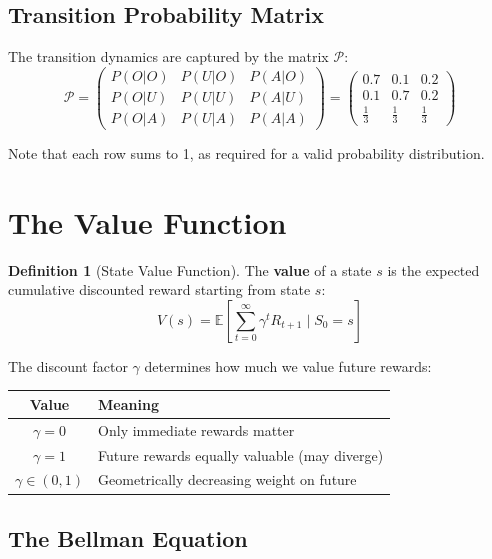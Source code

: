 \documentclass[11pt]{article}
\theoremstyle{definition}
\newtheorem{definition}{Definition}
\begin{document}
\subsection{Transition Probability Matrix}

The transition dynamics are captured by the matrix $\mathcal{P}$:
\[
\mathcal{P} = \begin{pmatrix}
P(O|O) & P(U|O) & P(A|O) \\
P(O|U) & P(U|U) & P(A|U) \\
P(O|A) & P(U|A) & P(A|A)
\end{pmatrix}
= \begin{pmatrix}
0.7 & 0.1 & 0.2 \\
0.1 & 0.7 & 0.2 \\
\frac{1}{3} & \frac{1}{3} & \frac{1}{3}
\end{pmatrix}
\]

Note that each row sums to 1, as required for a valid probability distribution.

\section{The Value Function}

\begin{definition}[State Value Function]
The \textbf{value} of a state $s$ is the expected cumulative discounted reward starting from state $s$:
\[
V(s) = \mathbb{E}\left[ \sum_{t=0}^{\infty} \gamma^t R_{t+1} \;\Big|\; S_0 = s \right]
\]
\end{definition}

The discount factor $\gamma$ determines how much we value future rewards:

\begin{center}
\begin{tabular}{c l}
\hline
\textbf{Value} & \textbf{Meaning} \\
\hline
$\gamma = 0$ & Only immediate rewards matter \\
$\gamma = 1$ & Future rewards equally valuable (may diverge) \\
$\gamma \in (0,1)$ & Geometrically decreasing weight on future \\
\hline
\end{tabular}
\end{center}

\subsection{The Bellman Equation}
\end{document}
